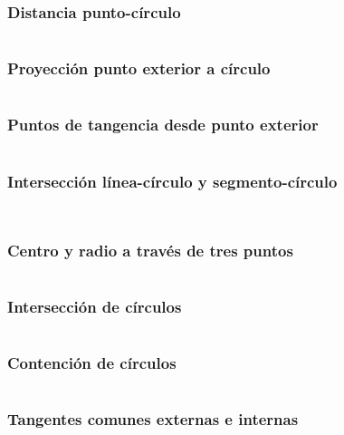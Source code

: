 \documentclass[11pt]{article}
\begin{document}
			\subsubsection{Distancia punto-círculo}
			\inputminted[tabsize=2,breaklines,firstline=321,lastline=324,fontsize=\small]{c++}{geometry.cpp}
			
			\subsubsection{Proyección punto exterior a círculo}
			\inputminted[tabsize=2,breaklines,firstline=326,lastline=329,fontsize=\small]{c++}{geometry.cpp}
			
			\subsubsection{Puntos de tangencia desde punto exterior}
			\inputminted[tabsize=2,breaklines,firstline=331,lastline=337,fontsize=\small]{c++}{geometry.cpp}
			
			\subsubsection{Intersección línea-círculo y segmento-círculo}
			\inputminted[tabsize=2,breaklines,firstline=339,lastline=349,fontsize=\small]{c++}{geometry.cpp}
			\inputminted[tabsize=2,breaklines,firstline=351,lastline=358,fontsize=\small]{c++}{geometry.cpp}
			
			\subsubsection{Centro y radio a través de tres puntos}
			\inputminted[tabsize=2,breaklines,firstline=360,lastline=365,fontsize=\small]{c++}{geometry.cpp}
			
			\subsubsection{Intersección de círculos}
			\inputminted[tabsize=2,breaklines,firstline=367,lastline=382,fontsize=\small]{c++}{geometry.cpp}
			
			\subsubsection{Contención de círculos}
			\inputminted[tabsize=2,breaklines,firstline=384,lastline=403,fontsize=\small]{c++}{geometry.cpp}
			
			\subsubsection{Tangentes comunes externas e internas}
			\inputminted[tabsize=2,breaklines,firstline=405,lastline=417,fontsize=\small]{c++}{geometry.cpp}
			
\end{document}
